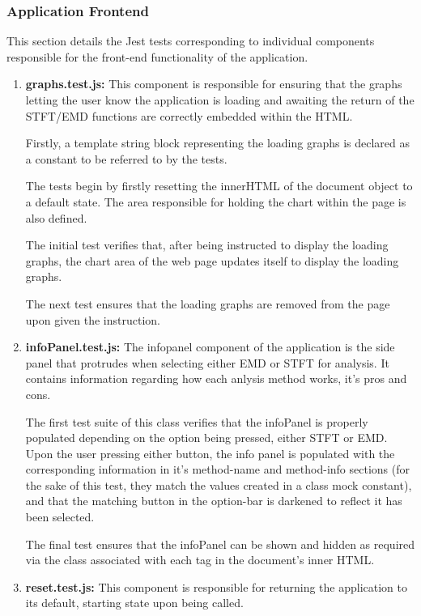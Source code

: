 \subsubsection{Application Frontend}
This section details the Jest tests corresponding to individual components responsible for the front-end functionality of the application.  

\begin{enumerate}
    \item {\bf graphs.test.js:} This component is responsible for ensuring that the graphs letting the user know the application is loading and awaiting the return of the STFT/EMD functions are correctly embedded within the HTML.
    
    Firstly, a template string block representing the loading graphs is declared as a constant to be referred to by the tests.
    
    The tests begin by firstly resetting the innerHTML of the document object to a default state. The area responsible for holding the chart within the page is also defined. 
    
    The initial test verifies that, after being instructed to display the loading graphs, the chart area of the web page updates itself to display the loading graphs.
    
    The next test ensures that the loading graphs are removed from the page upon given the instruction.
    
    \item {\bf infoPanel.test.js:} The infopanel component of the application is the side panel that protrudes when selecting either EMD or STFT for analysis. It contains information regarding how each anlysis method works, it's pros and cons. 
    
    The first test suite of this class verifies that the infoPanel is properly populated depending on the option being pressed, either STFT or EMD. Upon the user pressing either button, the info panel is populated with the corresponding information in it's method-name and method-info sections (for the sake of this test, they match the values created in a class mock constant), and that the matching button in the option-bar is darkened to reflect it has been selected. 
    
    The final test ensures that the infoPanel can be shown and hidden as required via the class associated with each tag in the document's inner HTML. 
    
    \item {\bf reset.test.js:} This component is responsible for returning the application to its default, starting state upon being called. 
    

\end{enumerate}
